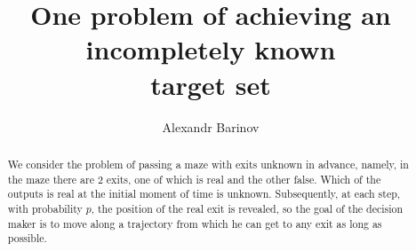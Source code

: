 \begin{englishtitle} %
\title{One problem of achieving an incompletely known\\ target set}
\author{Alexandr Barinov}


\maketitle

\begin{abstract}
We consider the problem of passing a maze with exits unknown in advance, namely, in the maze there are $2$ exits, one of which is real and the other false. Which of the outputs is real at the initial moment of time is unknown. Subsequently, at each step, with probability $p$, the position of the real exit is revealed, so the goal of the decision maker is to move along a trajectory from which he can get to any exit as long as possible.

\end{abstract}
\end{englishtitle}

\iffalse
%
%


\documentclass[12pt]{llncs}


\usepackage{iftex}

\ifPDFTeX
\usepackage[T2A]{fontenc}
\usepackage[utf8]{inputenc} %
\usepackage[english,russian]{babel}
\fi

\usepackage{todonotes}

\usepackage[russian]{nla}


\fi

